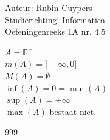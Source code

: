\documentclass[a4paper]{article}
\newcommand{\R}{\mathbb{R}}
\begin{document}
  
\noindent \large Auteur: Rubin Cuypers \\
\noindent \large Studierichting:  Informatica\\
\noindent \large Oefeningenreeks 1A nr. 4.5\\

\medskip

\normalsize
$A=\R^+$\\

$m(A) = ]-\infty,0]$ \\

$ M(A)=\emptyset $\\

$\inf(A)=0=\min(A)$\\

$\sup(A)=+\infty$\\

$\max(A)$ bestaat niet.

\begin{thebibliography}{999}
\end{thebibliography}
\end{document}
